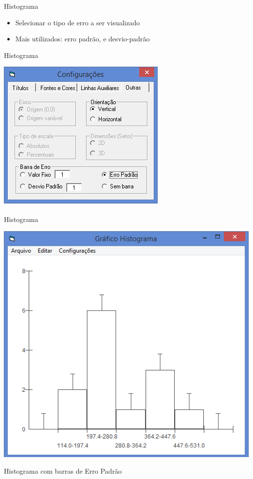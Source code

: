 \documentclass{beamer}
\begin{document}
\begin{frame}{Histograma}
  \begin{itemize}
  \item Selecionar o tipo de erro a ser visualizado
  \item Mais utilizados: erro padrão, e desvio-padrão
  \end{itemize}
\end{frame}

\begin{frame}{Histograma}
  \begin{center}
    \includegraphics[height=0.9\textheight]{histograma5}
  \end{center}
\end{frame}

\begin{frame}{Histograma}
  \begin{center}
    \includegraphics[height=0.7\textheight]{histograma6}
  \end{center}

  Histograma com barras de Erro Padrão
\end{frame}
\end{document}
